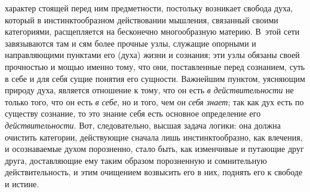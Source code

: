 характер стоящей перед ним предметности, постольку возникает свобода духа,
который в инстинктообразном действовании мышления, связанный своими
категориями, расщепляется на бесконечно многообразную материю. В~этой сети
завязываются там и сям более прочные узлы, служащие опорными и
направляющими пунктами его (духа) жизни и сознания; эти узлы обязаны своей
прочностью и мощью именно тому, что они, поставленные перед сознанием, суть
в себе и для себя сущие понятия его сущности. Важнейшим пунктом, уясняющим
природу духа, является отношение к тому, что он есть
{\em в действительности} не только того, что он есть
{\em в себе}, но и того, чем он
{\em себя знает}; так как дух есть по существу
сознание, то это знание себя есть основное определение его
{\em действительности}. Вот, следовательно, высшая
задача логики: она должна очистить категории, действующие сначала лишь
инстинктообразно, как влечения, и осознаваемые духом порозненно, стало
быть, как изменчивые и путающие друг друга, доставляющие ему таким образом
порозненную и сомнительную действительность, и этим очищением возвысить его
в них, поднять его к свободе и истине.

